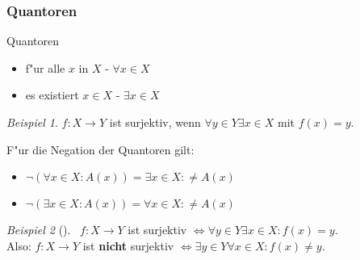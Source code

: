 \documentclass[11pt]{article}
\theoremstyle{remark}
\newtheorem{exa}{Beispiel}[section]
\theoremstyle{definition}
\theoremstyle{remark}
\begin{document}
\subsubsection{Quantoren}
\label{sec:orgd2b2557}
\begin{definition}{Quantoren}{}
\begin{itemize}
\item f"ur alle \(x\) in \(X\) - \(\forall x \in X\)
\item es existiert \(x \in X\) - \(\exists x \in X\)
\end{itemize}
\end{definition}

\begin{exa}
\(f:X\to Y\) ist surjektiv, wenn \(\forall y \in Y \exists x\in X\) mit \(f(x)=y\).
\end{exa}

F"ur die Negation der Quantoren gilt:
\begin{relation}
\begin{itemize}
\item \(\neg(\forall x\in X : A(x)) = \exists x\in X : \neq A(x)\)
\item \(\neg(\exists x\in X : A(x)) = \forall x\in X : \neq A(x)\)
\end{itemize}
\end{relation}

\begin{exa}[] \label{} \
\(f: X\to Y\) ist surjektiv \(\iff \forall y\in Y \exists x\in X : f(x)=y\).\\
Also: \(f: X\to Y\) ist \textbf{nicht} surjektiv \(\iff \exists y\in Y \forall x\in X : f(x)\not=y\).
\end{exa}
\end{document}
